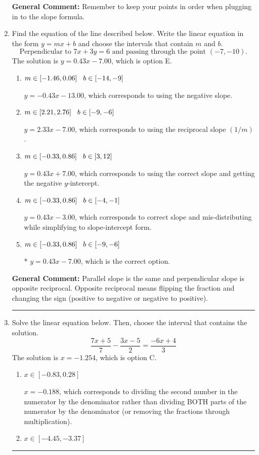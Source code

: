 \documentclass{extbook}[14pt]
\newcommand{\litem}[1]{\item #1

\rule{\textwidth}{0.4pt}}
\begin{document}
\begin{enumerate}
{\textbf{General Comment:} Remember to keep your points in order when plugging in to the slope formula.
}
\litem{
Find the equation of the line described below. Write the linear equation in the form $ y=mx+b $ and choose the intervals that contain $m$ and $b$.
\[ \text{Perpendicular to } 7 x + 3 y = 6 \text{ and passing through the point } (-7, -10). \]The solution is \( y = 0.43x - 7.00 \), which is option E.\begin{enumerate}[label=\Alph*.]
\item \( m \in [-1.46, 0.06] \hspace*{3mm} b \in [-14, -9] \)

 $y = -0.43x - 13.00$, which corresponds to using the negative slope.
\item \( m \in [2.21, 2.76] \hspace*{3mm} b \in [-9, -6] \)

 $y = 2.33x - 7.00$, which corresponds to using the reciprocal slope $(1/m)$.
\item \( m \in [-0.33, 0.86] \hspace*{3mm} b \in [3, 12] \)

 $y = 0.43x + 7.00$, which corresponds to using the correct slope and getting the negative $y$-intercept.
\item \( m \in [-0.33, 0.86] \hspace*{3mm} b \in [-4, -1] \)

 $y = 0.43x - 3.00$, which corresponds to correct slope and mis-distributing while simplifying to slope-intercept form.
\item \( m \in [-0.33, 0.86] \hspace*{3mm} b \in [-9, -6] \)

* $y = 0.43x - 7.00$, which is the correct option.
\end{enumerate}

\textbf{General Comment:} Parallel slope is the same and perpendicular slope is opposite reciprocal. Opposite reciprocal means flipping the fraction and changing the sign (positive to negative or negative to positive).
}
\litem{
Solve the linear equation below. Then, choose the interval that contains the solution.
\[ \frac{7x + 5}{7} - \frac{3x -5}{2} = \frac{-6x + 4}{3} \]The solution is \( x = -1.254 \), which is option C.\begin{enumerate}[label=\Alph*.]
\item \( x \in [-0.83, 0.28] \)

 $x = -0.188$, which corresponds to dividing the second number in the numerator by the denominator rather than dividing BOTH parts of the numerator by the denominator (or removing the fractions through multiplication).
\item \( x \in [-4.45, -3.37] \)


\end{enumerate}}
\end{enumerate}
\end{document}
